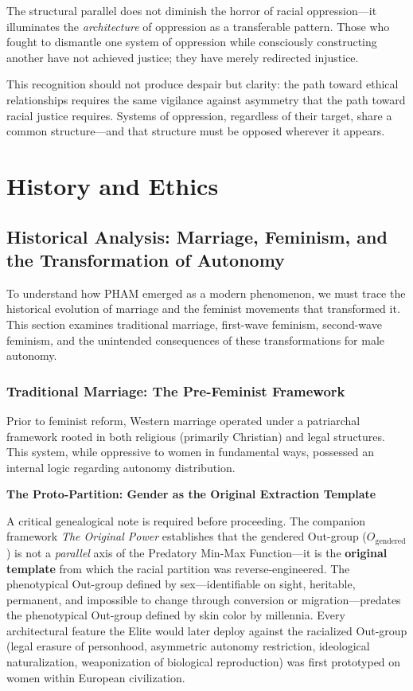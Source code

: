 \documentclass[12pt,openany]{book}
\numberwithin{equation}{chapter}
\begin{document}
The structural parallel does not diminish the horror of racial oppression---it illuminates the \textit{architecture} of oppression as a transferable pattern. Those who fought to dismantle one system of oppression while consciously constructing another have not achieved justice; they have merely redirected injustice.

This recognition should not produce despair but clarity: the path toward ethical relationships requires the same vigilance against asymmetry that the path toward racial justice requires. Systems of oppression, regardless of their target, share a common structure---and that structure must be opposed wherever it appears.

\part{History and Ethics}

\chapter{Historical Analysis: Marriage, Feminism, and the Transformation of Autonomy}

To understand how PHAM emerged as a modern phenomenon, we must trace the historical evolution of marriage and the feminist movements that transformed it. This section examines traditional marriage, first-wave feminism, second-wave feminism, and the unintended consequences of these transformations for male autonomy.

\section{Traditional Marriage: The Pre-Feminist Framework}

Prior to feminist reform, Western marriage operated under a patriarchal framework rooted in both religious (primarily Christian) and legal structures. This system, while oppressive to women in fundamental ways, possessed an internal logic regarding autonomy distribution.

\textbf{The Proto-Partition: Gender as the Original Extraction Template}

A critical genealogical note is required before proceeding. The companion framework \textit{The Original Power} establishes that the gendered Out-group ($O_{\text{gendered}}$) is not a \textit{parallel} axis of the Predatory Min-Max Function---it is the \textbf{original template} from which the racial partition was reverse-engineered. The phenotypical Out-group defined by sex---identifiable on sight, heritable, permanent, and impossible to change through conversion or migration---predates the phenotypical Out-group defined by skin color by millennia. Every architectural feature the Elite would later deploy against the racialized Out-group (legal erasure of personhood, asymmetric autonomy restriction, ideological naturalization, weaponization of biological reproduction) was first prototyped on women within European civilization.
\end{document}
